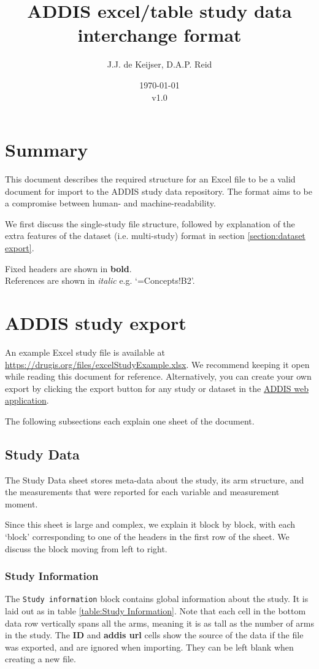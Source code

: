 \documentclass[a4paper,10pt]{article}
\title{ADDIS excel/table study data interchange format}
\author{J.J. de Keijser, D.A.P. Reid}
\date{\today\\v1.0}
\begin{document}
\maketitle
\section{Summary}

This document describes the required structure for an Excel file to be a valid document for import to the ADDIS study data repository. The format aims to be a compromise between human- and machine-readability.

We first discuss the single-study file structure, followed by explanation of the extra features of the dataset (i.e. multi-study) format in section \ref{section:dataset export}.

Fixed headers are shown in \textbf{bold}.\\
References are shown in \textit{italic} e.g. `=Concepts!B2'.\\

\section{ADDIS study export}
An example Excel study file is available at \url{https://drugis.org/files/excelStudyExample.xlsx}. We recommend keeping it open while reading this document for reference. Alternatively, you can create your own export by clicking the export button for any study or dataset in the \href{https://addis.drugis.org/}{ADDIS web application}.


The following subsections each explain one sheet of the document.

\subsection{Study Data}
The Study Data sheet stores meta-data about the study, its arm structure, and the measurements that were reported for each variable and measurement moment.

Since this sheet is large and complex, we explain it block by block, with each `block' corresponding to one of the headers in the first row of the sheet. We discuss the block moving from left to right.

\subsubsection{Study Information}
The \texttt{Study information} block contains global information about the study. It is laid out as in table \ref{table:Study Information}. Note that each cell in the bottom data row vertically spans all the arms, meaning it is as tall as the number of arms in the study. The \textbf{ID} and \textbf{addis url} cells show the source of the data if the file was exported, and are ignored when importing. They can be left blank when creating a new file.
\end{document}
